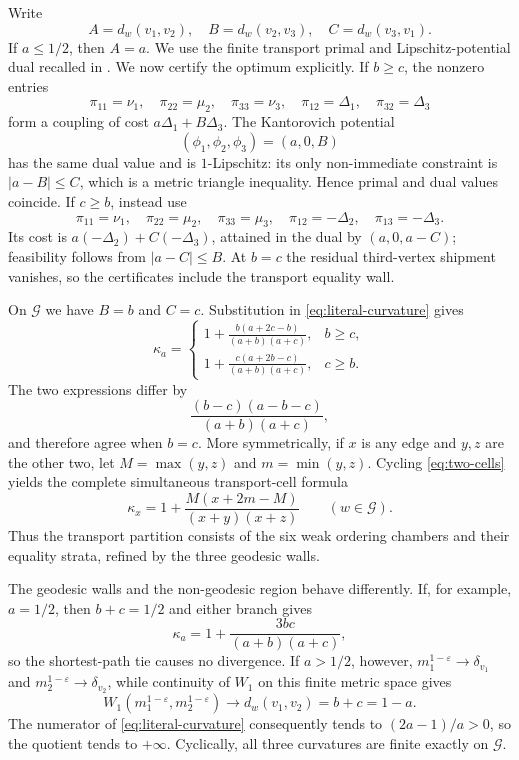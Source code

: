 \documentclass[11pt]{article}
\theoremstyle{remark}
\newcommand{\G}{\mathcal G}
\begin{document}
Write
\[
 A=d_w(v_1,v_2),\quad B=d_w(v_2,v_3),\quad C=d_w(v_3,v_1).
\]
If $a\leq1/2$, then $A=a$.  We use the finite transport primal and
Lipschitz-potential dual recalled in \cite[Section 2]{BaiLinLuWangYau2024}.
We now certify the optimum explicitly.  If $b\geq c$, the
nonzero entries
\[
 \pi_{11}=\nu_1,\quad \pi_{22}=\mu_2,\quad \pi_{33}=\nu_3,
 \quad \pi_{12}=\Delta_1,\quad \pi_{32}=\Delta_3
\]
form a coupling of cost $a\Delta_1+B\Delta_3$.  The Kantorovich potential
\[
 (\phi_1,\phi_2,\phi_3)=(a,0,B)
\]
has the same dual value and is $1$-Lipschitz: its only non-immediate
constraint is $|a-B|\leq C$, which is a metric triangle inequality.  Hence
primal and dual values coincide.  If $c\geq b$, instead use
\[
 \pi_{11}=\nu_1,\quad \pi_{22}=\mu_2,\quad \pi_{33}=\mu_3,
 \quad \pi_{12}=-\Delta_2,\quad \pi_{13}=-\Delta_3.
\]
Its cost is $a(-\Delta_2)+C(-\Delta_3)$, attained in the dual by
$(a,0,a-C)$; feasibility follows from $|a-C|\leq B$.  At $b=c$ the residual
third-vertex shipment vanishes, so the certificates include the transport
equality wall.

On $\G$ we have $B=b$ and $C=c$.  Substitution in
\eqref{eq:literal-curvature} gives
\begin{equation}\label{eq:two-cells}
 \kappa_a=
 \begin{cases}
  \displaystyle 1+\frac{b(a+2c-b)}{(a+b)(a+c)},&b\geq c,\\[6pt]
  \displaystyle 1+\frac{c(a+2b-c)}{(a+b)(a+c)},&c\geq b.
 \end{cases}
\end{equation}
The two expressions differ by
\[
 \frac{(b-c)(a-b-c)}{(a+b)(a+c)},
\]
and therefore agree when $b=c$.  More symmetrically, if $x$ is any edge and
$y,z$ are the other two, let $M=\max(y,z)$ and $m=\min(y,z)$.  Cycling
\eqref{eq:two-cells} yields the complete simultaneous transport-cell formula
\begin{equation}\label{eq:curvature-vector}
 \displaystyle
 \kappa_x=1+\frac{M(x+2m-M)}{(x+y)(x+z)}\qquad(w\in\G).
\end{equation}
Thus the transport partition consists of the six weak ordering chambers and
their equality strata, refined by the three geodesic walls.

The geodesic walls and the non-geodesic region behave differently.  If, for
example, $a=1/2$, then $b+c=1/2$ and either branch gives
\begin{equation}\label{eq:tied-edge}
 \kappa_a=1+\frac{3bc}{(a+b)(a+c)},
\end{equation}
so the shortest-path tie causes no divergence.  If $a>1/2$, however,
$m_1^{1-\varepsilon}\to\delta_{v_1}$ and
$m_2^{1-\varepsilon}\to\delta_{v_2}$, while continuity of $W_1$ on this
finite metric space gives
\[
 W_1(m_1^{1-\varepsilon},m_2^{1-\varepsilon})\longrightarrow
 d_w(v_1,v_2)=b+c=1-a.
\]
The numerator of \eqref{eq:literal-curvature} consequently tends to
$(2a-1)/a>0$, so the quotient tends to $+\infty$.  Cyclically, all three
curvatures are finite exactly on $\G$.
\end{document}
